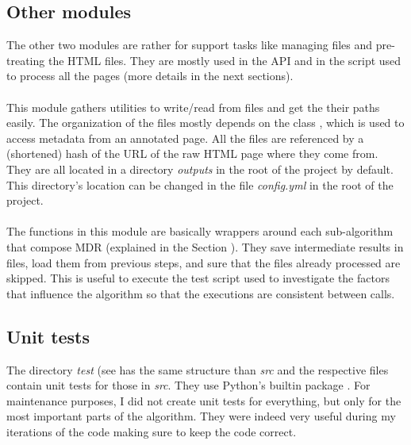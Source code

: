 \documentclass[10pt]{article}
\begin{document}
\subsection{Other modules} \label{txt:other-modules}

The other two modules are rather for support tasks like managing files and pre-treating the HTML files. They are mostly used in the API and in the script used to process all the pages (more details in the next sections). 

\paragraph{} 

This module gathers utilities to write/read from files and get the their paths easily. The organization of the files mostly depends on the class , which is used to access metadata from an annotated page. All the files are referenced by a (shortened) hash of the URL of the raw HTML page where they come from. They are all located in a directory \emph{outputs} in the root of the project by default. This directory's location can be changed in the file \emph{config.yml} in the root of the project.

\paragraph{}

The functions in this module are basically wrappers around each sub-algorithm that compose MDR (explained in the Section ). They save intermediate results in files, load them from previous steps, and sure that the files already processed are skipped. This is useful to execute the test script used to investigate the factors that influence the algorithm so that the executions are consistent between calls.



\subsection{Unit tests}

The directory \emph{test} (see has the same structure than \emph{src} and the respective files contain unit tests for those in \emph{src}. They use Python's builtin package . For maintenance purposes, I did not create unit tests for everything, but only for the most important parts of the algorithm. They were indeed very useful during my iterations of the code making sure to keep the code correct. 
\end{document}
